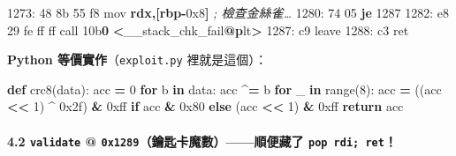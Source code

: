 \documentclass[10pt,a4paper]{article}
\newenvironment{Shaded}{\begin{snugshade}}{\end{snugshade}}
\newcommand{\BaseNTok}[1]{\textcolor[rgb]{0.00,0.00,0.81}{#1}}
\newcommand{\BuiltInTok}[1]{#1}
\newcommand{\CommentTok}[1]{\textcolor[rgb]{0.56,0.35,0.01}{\textit{#1}}}
\newcommand{\ControlFlowTok}[1]{\textcolor[rgb]{0.13,0.29,0.53}{\textbf{#1}}}
\newcommand{\DecValTok}[1]{\textcolor[rgb]{0.00,0.00,0.81}{#1}}
\newcommand{\ErrorTok}[1]{\textcolor[rgb]{0.64,0.00,0.00}{\textbf{#1}}}
\newcommand{\FunctionTok}[1]{\textcolor[rgb]{0.13,0.29,0.53}{\textbf{#1}}}
\newcommand{\KeywordTok}[1]{\textcolor[rgb]{0.13,0.29,0.53}{\textbf{#1}}}
\newcommand{\NormalTok}[1]{#1}
\newcommand{\OperatorTok}[1]{\textcolor[rgb]{0.81,0.36,0.00}{\textbf{#1}}}
\renewenvironment{Shaded}{%
  \def\FrameCommand{\fboxsep=3.2pt\colorbox{shadecolor}}%
  \MakeFramed{\advance\hsize-\width\FrameRestore\small}%
}{%
  \endMakeFramed
}
\begin{document}
\begin{Shaded}
\begin{Highlighting}[]
\NormalTok{1273: 48 8b 55 f8            mov    }\KeywordTok{rdx}\OperatorTok{,[}\KeywordTok{rbp}\OperatorTok{{-}}\BaseNTok{0x8}\OperatorTok{]}         \CommentTok{; 檢查金絲雀…}
\NormalTok{1280: 74 05                  }\ControlFlowTok{je}     \DecValTok{1287}
\NormalTok{1282: e8 }\DecValTok{29}\NormalTok{ fe ff ff         call   }\BaseNTok{10b}\ErrorTok{0} \OperatorTok{\textless{}}\NormalTok{\_\_stack\_chk\_fail}\FunctionTok{@}\ErrorTok{p}\NormalTok{lt}\OperatorTok{\textgreater{}}
\NormalTok{1287: c9                     leave}
\NormalTok{1288: c3                     ret}
\end{Highlighting}
\end{Shaded}

\textbf{Python 等價實作}（\texttt{exploit.\allowbreak{}py} 裡就是這個）：

\begin{Shaded}
\begin{Highlighting}[]
\KeywordTok{def}\NormalTok{ crc8(data):}
\NormalTok{    acc }\OperatorTok{=} \DecValTok{0}
    \ControlFlowTok{for}\NormalTok{ b }\KeywordTok{in}\NormalTok{ data:}
\NormalTok{        acc }\OperatorTok{\^{}=}\NormalTok{ b}
        \ControlFlowTok{for}\NormalTok{ \_ }\KeywordTok{in} \BuiltInTok{range}\NormalTok{(}\DecValTok{8}\NormalTok{):}
\NormalTok{            acc }\OperatorTok{=}\NormalTok{ ((acc }\OperatorTok{\textless{}\textless{}} \DecValTok{1}\NormalTok{) }\OperatorTok{\^{}} \BaseNTok{0x2f}\NormalTok{) }\OperatorTok{\&} \BaseNTok{0xff} \ControlFlowTok{if}\NormalTok{ acc }\OperatorTok{\&} \BaseNTok{0x80} \ControlFlowTok{else}\NormalTok{ (acc }\OperatorTok{\textless{}\textless{}} \DecValTok{1}\NormalTok{) }\OperatorTok{\&} \BaseNTok{0xff}
    \ControlFlowTok{return}\NormalTok{ acc}
\end{Highlighting}
\end{Shaded}

\paragraph{\texorpdfstring{4.2 \texttt{validate} @
\texttt{0x1289}（鑰匙卡魔數）------順便藏了
\texttt{pop\ \allowbreak{}rdi;\ \allowbreak{}ret}！}{4.2 validate @ 0x1289（鑰匙卡魔數）------順便藏了 pop rdi; ret！}}\label{validate-0x1289ux9470ux5319ux5361ux9b54ux6578ux9806ux4fbfux85cfux4e86-pop-rdi-ret}
\end{document}

